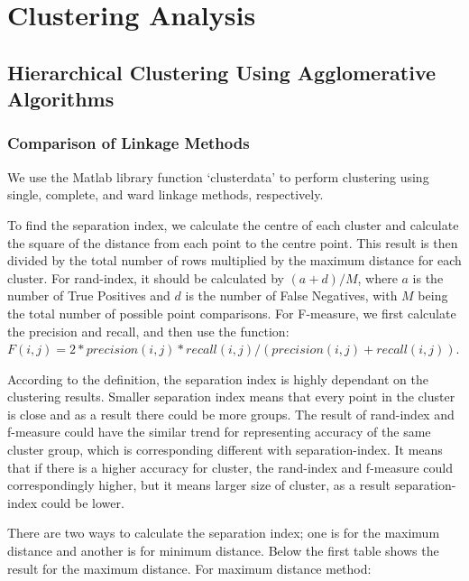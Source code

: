 \documentclass[]{article}
\begin{document}
\section{Clustering Analysis}
\subsection{Hierarchical Clustering Using Agglomerative Algorithms}
\subsubsection{Comparison of Linkage Methods}
We use the Matlab library function `clusterdata' to perform clustering using single, complete, and ward linkage methods, respectively.

To find the separation index, we calculate the centre of each cluster and calculate the square of the distance from each point to the centre point. This result is then divided by the total number of rows multiplied by the maximum distance for each cluster. For rand-index, it should be calculated by $(a+d)/M$, where $a$ is the number of True Positives and $d$ is the number of False Negatives, with $M$ being the total number of possible point comparisons. For F-measure, we first calculate the precision and recall, and then use the function:   
$F(i,j) = 2*precision(i,j)* recall(i,j)/(precision(i,j)+recall(i,j)).$


According to the definition, the separation index is highly dependant on the clustering results. Smaller separation index means that every point in the cluster is close and as a result there could be more groups.
The result of rand-index and f-measure could have the similar trend for representing accuracy of the same cluster group, which is corresponding different with separation-index. It means that if there is a higher accuracy for cluster, the rand-index and f-measure could correspondingly higher, but it means larger size of cluster, as a result separation-index could be lower.



There are two ways to calculate the separation index; one is for the maximum distance and another is for minimum distance. Below the first table shows the result for the maximum distance.
For maximum distance method:

\end{document}
